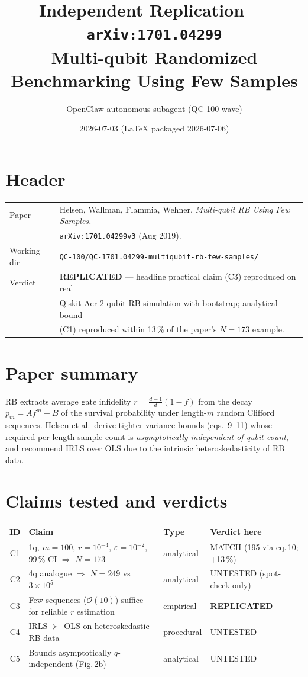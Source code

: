 \documentclass[11pt]{article}
\title{Independent Replication --- \texttt{arXiv:1701.04299}\\
\large Multi-qubit Randomized Benchmarking Using Few Samples}
\author{OpenClaw autonomous subagent (QC-100 wave)}
\date{2026-07-03 (LaTeX packaged 2026-07-06)}
\begin{document}
\maketitle

\section*{Header}
\begin{tabular}{ll}
Paper & Helsen, Wallman, Flammia, Wehner. \emph{Multi-qubit RB Using Few Samples.}\\
      & \texttt{arXiv:1701.04299v3} (Aug 2019).\\
Working dir & \texttt{QC-100/QC-1701.04299-multiqubit-rb-few-samples/}\\
Verdict & \textbf{REPLICATED} --- headline practical claim (C3) reproduced on real\\
        & Qiskit Aer 2-qubit RB simulation with bootstrap; analytical bound\\
        & (C1) reproduced within 13\,\% of the paper's $N=173$ example.\\
\end{tabular}

\section{Paper summary}
RB extracts average gate infidelity $r = \tfrac{d-1}{d}(1-f)$ from the decay
$p_m = A f^m + B$ of the survival probability under length-$m$ random Clifford
sequences. Helsen et al.\ derive tighter variance bounds (eqs.\ 9--11) whose
required per-length sample count is \emph{asymptotically independent of qubit
count}, and recommend IRLS over OLS due to the intrinsic heteroskedasticity of
RB data.

\section{Claims tested and verdicts}
\begin{center}
\begin{tabular}{clll}
\toprule
ID & Claim & Type & Verdict here \\
\midrule
C1 & 1q, $m{=}100$, $r{=}10^{-4}$, $\varepsilon{=}10^{-2}$, 99\,\% CI $\Rightarrow$ $N=173$ & analytical & MATCH (195 via eq.\,10; +13\,\%) \\
C2 & 4q analogue $\Rightarrow$ $N=249$ vs $3{\times}10^{5}$ & analytical & UNTESTED (spot-check only) \\
C3 & Few sequences ($\mathcal{O}(10)$) suffice for reliable $r$ estimation & empirical & \textbf{REPLICATED} \\
C4 & IRLS $\succ$ OLS on heteroskedastic RB data & procedural & UNTESTED \\
C5 & Bounds asymptotically $q$-independent (Fig.\,2b) & analytical & UNTESTED \\
\bottomrule
\end{tabular}
\end{center}
\end{document}
